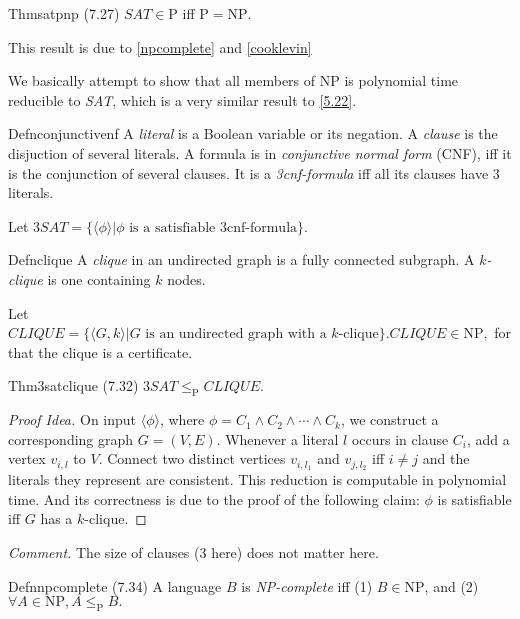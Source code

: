 \begin{reference}{Thm}{satpnp}
  (7.27) $\textit{SAT}\in \mathrm{P}$ iff $\mathrm{P}=\mathrm{NP}$.
\end{reference}

This result is due to \ref{npcomplete} and \ref{cooklevin}

We basically attempt to show that all members of NP is polynomial time reducible to \textit{SAT}, which is a very similar result to \ref{5.22}.

\begin{reference}{Defn}{conjunctivenf}
  A \emph{literal} is a Boolean variable or its negation. A \emph{clause} is the disjuction of several literals. A formula is in \emph{conjunctive normal form} (CNF), iff it is the conjunction of several clauses. It is a \emph{3cnf-formula} iff all its clauses have 3 literals.
\end{reference}

Let $3\textit{SAT}=\{\langle \phi\rangle|\phi\text{ is a satisfiable 3cnf-formula}\}$.

\begin{reference}{Defn}{clique}
  A \emph{clique} in an undirected graph is a fully connected subgraph. A \emph{$k$-clique} is one containing $k$ nodes.
\end{reference}

Let $\textit{CLIQUE}=\{\langle G,k\rangle|G\text{ is an undirected graph with a $k$-clique}\}. \textit{CLIQUE}\in \mathrm{NP},$ for that the clique is a certificate.

\begin{reference}{Thm}{3satclique}
  (7.32) $3\textit{SAT}\leq_{\mathrm{P}} \textit{CLIQUE}$.
\end{reference}

\begin{proof}[Proof Idea]
  On input $\langle \phi\rangle$, where $\phi=C_1\wedge C_2\wedge\cdots\wedge C_k$, we construct a corresponding graph $G=(V,E)$. Whenever a literal $l$ occurs in clause $C_i$, add a vertex $v_{i,l}$ to $V$. Connect two distinct vertices $v_{i,l_1}$ and $v_{j,l_2}$ iff $i\neq j$ and the literals they represent are consistent. This reduction is computable in polynomial time. And its correctness is due to the proof of the following claim: $\phi$ is satisfiable iff $G$ has a $k$-clique.
\end{proof}

\textit{Comment.} The size of clauses (3 here) does not matter here.

\begin{reference}{Defn}{npcomplete}
  (7.34) A language \( B \) is \emph{NP-complete} iff (1) \( B\in \mathrm{NP} \), and (2) $\forall A\in \mathrm{NP}, A\leq_{\mathrm{P}} B.$
\end{reference}

